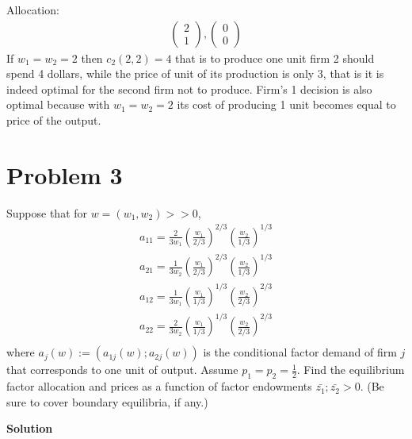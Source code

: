 \documentclass[a4paper]{article}
\begin{document}
Allocation:
\begin{align*}
\begin{pmatrix}
2\\
1
\end{pmatrix}, \begin{pmatrix}
0\\
0
\end{pmatrix}
\end{align*}
If $w_1 = w_2 = 2$ then $c_2(2, 2) = 4$ that is to produce one unit firm 2 should spend 4 dollars, while the price of unit of its production is only 3, that is it is indeed optimal for the second firm not to produce. Firm's 1 decision is also optimal because with $w_1 = w_2 = 2$ its cost of producing 1 unit becomes equal to price of the output. 
\section*{Problem 3}
Suppose that for $w = (w_1, w_2) >> 0$, \begin{align*}
a_{11} = \frac{2}{3w_1}\left(\frac{w_1}{2/3}\right)^{2/3}\left(\frac{w_2}{1/3}\right)^{1/3}\\
a_{21} = \frac{1}{3w_2}\left(\frac{w_1}{2/3}\right)^{2/3}\left(\frac{w_2}{1/3}\right)^{1/3}\\
a_{12} = \frac{1}{3w_1}\left(\frac{w_1}{1/3}\right)^{1/3}\left(\frac{w_2}{2/3}\right)^{2/3}\\
a_{22} = \frac{2}{3w_2}\left(\frac{w_1}{1/3}\right)^{1/3}\left(\frac{w_2}{2/3}\right)^{2/3}\\
\end{align*}
where $a_j(w) := (a_{1j}(w); a_{2j}(w))$ is the conditional factor demand of firm $j$ that corresponds
to one unit of output. Assume $p_1 = p_2 = \frac{1}{2}$. Find the equilibrium factor allocation and
prices as a function of factor endowments $\bar{z_1}; \bar{z_2} > 0$. (Be sure to cover boundary equilibria,
if any.)




\textbf{Solution}
\end{document}
